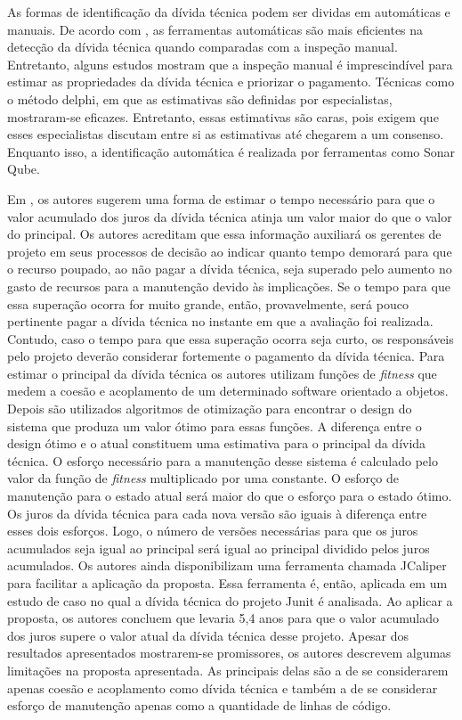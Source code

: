 As formas de identificação da dívida técnica podem ser dividas em automáticas e manuais. De acordo com \cite{zazworka2013case},  as ferramentas automáticas são mais eficientes na detecção da dívida técnica quando comparadas com a inspeção manual. Entretanto, alguns estudos mostram que a inspeção manual é imprescindível para estimar as propriedades da dívida técnica e priorizar o pagamento. Técnicas como o método delphi\cite{szabados2015technical}, em que as estimativas são definidas por especialistas, mostraram-se eficazes. Entretanto, essas estimativas são caras, pois exigem que esses especialistas discutam entre si as estimativas até chegarem a um consenso. Enquanto isso, a identificação automática é realizada por ferramentas como Sonar Qube\cite{campbell2013sonarqube}. 


Em \cite{chatzigeorgiou2015estimating}, os autores sugerem uma forma de estimar o tempo necessário para que  o valor acumulado dos juros da dívida técnica atinja um valor maior do que o valor do principal. Os autores acreditam que essa informação auxiliará os gerentes de projeto em seus processos de decisão ao indicar quanto tempo demorará para que o recurso poupado, ao não pagar a dívida técnica, seja superado pelo aumento no gasto de recursos para a  manutenção devido às implicações. Se o tempo para que essa superação ocorra for muito grande, então, provavelmente, será pouco pertinente pagar a dívida técnica no instante em que a avaliação foi realizada. Contudo, caso o tempo para que essa superação ocorra seja curto, os responsáveis pelo projeto deverão considerar fortemente o pagamento da dívida técnica. Para estimar o principal da dívida técnica os autores utilizam funções de \textit{fitness} que medem a coesão e acoplamento de um determinado software orientado a objetos. Depois são utilizados algoritmos de otimização para encontrar o design do sistema que produza um valor ótimo para essas funções. A diferença entre o design ótimo e o atual constituem uma estimativa para o principal  da dívida técnica. O esforço necessário para a manutenção desse sistema é calculado pelo valor da função de \textit{fitness} multiplicado por uma constante. O esforço de manutenção para o estado atual será maior do que o esforço para o estado ótimo. Os juros da dívida técnica para cada nova versão são iguais à diferença entre esses dois esforços. Logo, o número de versões necessárias para que os juros acumulados seja igual ao principal será igual ao principal dividido pelos juros acumulados. Os autores ainda disponibilizam uma ferramenta chamada JCaliper para facilitar a aplicação da proposta. Essa ferramenta é, então, aplicada em um estudo de caso no qual a dívida técnica do projeto Junit é analisada. Ao aplicar a proposta, os autores concluem que levaria 5,4 anos para que o valor acumulado dos juros supere o valor atual da dívida técnica desse projeto. Apesar dos resultados apresentados mostrarem-se promissores, os autores descrevem algumas limitações na proposta apresentada. As principais delas  são a  de se considerarem apenas coesão e acoplamento como dívida técnica e também a de se considerar esforço de manutenção apenas como a quantidade de linhas de código.



